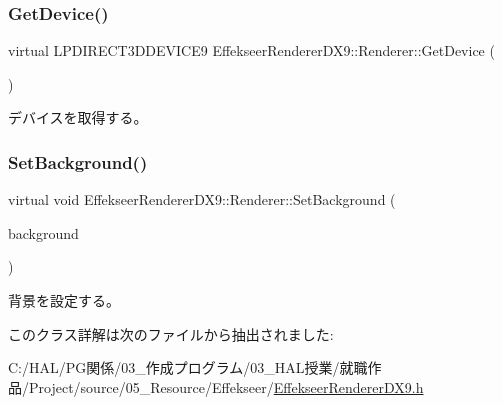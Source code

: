 \subsubsection{\texorpdfstring{Get\+Device()}{GetDevice()}}
{\footnotesize\ttfamily virtual L\+P\+D\+I\+R\+E\+C\+T3\+D\+D\+E\+V\+I\+C\+E9 Effekseer\+Renderer\+D\+X9\+::\+Renderer\+::\+Get\+Device (\begin{DoxyParamCaption}{ }\end{DoxyParamCaption})\hspace{0.3cm}{\ttfamily [pure virtual]}}



デバイスを取得する。 

\mbox{\label{class_effekseer_renderer_d_x9_1_1_renderer_a4ba4636b187f74288fdd6ff68071196d}} 
\subsubsection{\texorpdfstring{Set\+Background()}{SetBackground()}}
{\footnotesize\ttfamily virtual void Effekseer\+Renderer\+D\+X9\+::\+Renderer\+::\+Set\+Background (\begin{DoxyParamCaption}\item[{I\+Direct3\+D\+Texture9 $\ast$}]{background }\end{DoxyParamCaption})\hspace{0.3cm}{\ttfamily [pure virtual]}}



背景を設定する。 



このクラス詳解は次のファイルから抽出されました\+:\begin{DoxyCompactItemize}
\item 
C\+:/\+H\+A\+L/\+P\+G関係/03\+\_\+作成プログラム/03\+\_\+\+H\+A\+L授業/就職作品/\+Project/source/05\+\_\+\+Resource/\+Effekseer/\mbox{\hyperlink{_effekseer_renderer_d_x9_8h}{Effekseer\+Renderer\+D\+X9.\+h}}\end{DoxyCompactItemize}
